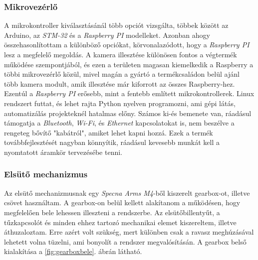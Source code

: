 \documentclass[12pt,a4paper]{article}
\begin{document}
%
%
%
%
%

\subsubsection{Mikrovezérlő}

A mikrokontroller kiválasztásánál több opciót vizsgálta, többek között az {Arduino}, az \textsl{STM-32} és a \textsl{Raspberry PI} modelleket. Azonban ahogy összehasonlítottam a különböző opciókat, körvonalazódott, hogy a \textsl{Raspberry PI} lesz a megfelelő megoldás. A kamera illesztése különösen fontos a végtermék működése szempontjából, és ezen a területen magasan kiemelkedik a Raspberry a többi mikrovezérlő közül, mivel magán a gyártó a termékcsaládon belül ajánl több kamera modult, amik illesztése már kiforrott az összes Raspberry-hez.\\

Ezentúl a \textsl{Raspberry PI} erősebb, mint a fentebb említett mikrokontrollerek. Linux rendszert futtat, és lehet rajta Python nyelven programozni, ami gépi látás, automatizálás projekteknél hatalmas előny. Számos ki-és bemenete van, ráadásul támogatja a \textsl{Bluetooth}, \textsl{Wi-Fi}, és \textsl{Ethernet} kapcsolatokat is, nem beszélve a rengeteg bővítő "kabátról", amiket lehet kapni hozzá. Ezek a termék továbbfejlesztését nagyban könnyítik, ráadásul kevesebb munkát kell a nyomtatott áramkör tervezésébe tenni.


\subsubsection{Elsütő mechanizmus}
Az elsütő mechanizmusnak egy \textsl{Specna Arms M4}-ből kiszerelt gearbox-ot, illetve csövet használtam. A gearbox-on belül kellett alakítanom a működésen, hogy megfelelően bele lehessen illeszteni a rendszerbe. Az elsütőbillentyűt, a tűzkapcsolót és minden ehhez tartozó mechanikai elemet kiszereltem, illetve áthuzaloztam. Erre azért volt szükség, mert különben csak a ravasz meghúzásával lehetett volna tüzelni, ami bonyolít a rendszer megvalósításán. A gearbox belső kialakítása a \ref{fig:gearboxbele}. ábrán látható.
\end{document}
